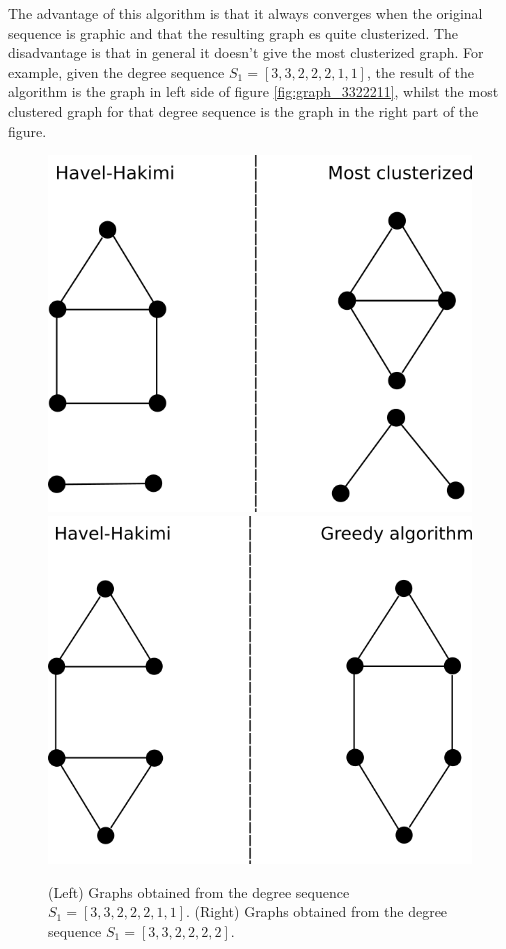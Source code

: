 \documentclass{article}
\begin{document}
The advantage of this algorithm is that it always converges when the original sequence is graphic and that the resulting graph es quite clusterized. The disadvantage is that in general it doesn't give the most clusterized graph. For example, given the degree sequence $S_1 = [3, 3, 2, 2, 2, 1, 1]$, the result of the algorithm is the graph in left side of figure \ref{fig:graph_3322211}, whilst the most clustered graph for that degree sequence is the graph in the right part of the figure.

\begin{figure}[ht!]
\centering
\includegraphics[scale=0.7]{./figs/graph_3322211.png}\hfill%
\includegraphics[scale=0.7]{./figs/graph_332222.png}
\caption{(Left) Graphs obtained from the degree sequence $S_1 = [3, 3, 2, 2, 2, 1, 1]$. (Right) Graphs obtained from the degree sequence $S_1 = [3, 3, 2, 2, 2, 2]$.}
\label{fig:clusteredGraphExamples}
\end{figure}
\end{document}
